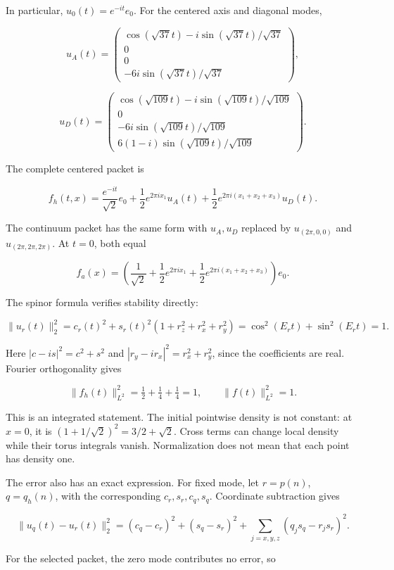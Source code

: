 In particular, \(u_0(t)=e^{-it}e_0\). For the centered axis and diagonal
modes,

\[
u_A(t)=
\begin{pmatrix}
\cos(\sqrt{37}t)-i\sin(\sqrt{37}t)/\sqrt{37}\\
0\\
0\\
-6i\sin(\sqrt{37}t)/\sqrt{37}
\end{pmatrix},
\]

\[
u_D(t)=
\begin{pmatrix}
\cos(\sqrt{109}t)-i\sin(\sqrt{109}t)/\sqrt{109}\\
0\\
-6i\sin(\sqrt{109}t)/\sqrt{109}\\
6(1-i)\sin(\sqrt{109}t)/\sqrt{109}
\end{pmatrix}.
\]

The complete centered packet is

\[
f_h(t,x)=\frac{e^{-it}}{\sqrt2}e_0
+\frac12e^{2\pi ix_1}u_A(t)
+\frac12e^{2\pi i(x_1+x_2+x_3)}u_D(t).
\]

The continuum packet has the same form with \(u_A,u_D\) replaced by
\(u_{(2\pi,0,0)}\) and \(u_{(2\pi,2\pi,2\pi)}\). At \(t=0\), both equal

\[
f_a(x)=\left(\frac1{\sqrt2}+\frac12e^{2\pi ix_1}
+\frac12e^{2\pi i(x_1+x_2+x_3)}\right)e_0.
\]

The spinor formula verifies stability directly:

\[
\|u_r(t)\|_2^2
=c_r(t)^2+s_r(t)^2(1+r_z^2+r_x^2+r_y^2)
=\cos^2(E_rt)+\sin^2(E_rt)=1.
\]

Here \(|c-is|^2=c^2+s^2\) and \(|r_y-ir_x|^2=r_x^2+r_y^2\), since the
coefficients are real. Fourier orthogonality gives

\[
\|f_h(t)\|_{L^2}^2=\tfrac12+\tfrac14+\tfrac14=1,\qquad
\|f(t)\|_{L^2}^2=1.
\]

This is an integrated statement. The initial pointwise density is not
constant: at \(x=0\), it is \((1+1/\sqrt2)^2=3/2+\sqrt2\). Cross terms
can change local density while their torus integrals vanish.
Normalization does not mean that each point has density one.

The error also has an exact expression. For fixed mode, let \(r=p(n)\),
\(q=q_h(n)\), with the corresponding \(c_r,s_r,c_q,s_q\). Coordinate
subtraction gives

\[
\|u_q(t)-u_r(t)\|_2^2
=(c_q-c_r)^2+(s_q-s_r)^2
+\sum_{j=x,y,z}(q_js_q-r_js_r)^2.
\]

For the selected packet, the zero mode contributes no error, so

